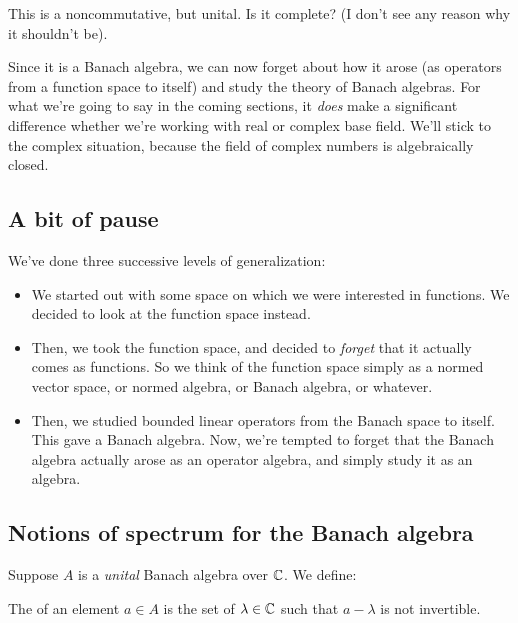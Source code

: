 \documentclass[a4paper]{amsart}
\begin{document}
This is a noncommutative, but unital. Is it complete? (I don't see any
reason why it shouldn't be).

Since it is a Banach algebra, we can now forget about how it arose (as
operators from a function space to itself) and study the theory of
Banach algebras. For what we're going to say in the coming sections,
it {\em does} make a significant difference whether we're working with
real or complex base field. We'll stick to the complex situation,
because the field of complex numbers is algebraically closed.

\subsection{A bit of pause}

We've done three successive levels of generalization:

\begin{itemize}

\item We started out with some space on which we were interested in
  functions. We decided to look at the function space instead.

\item Then, we took the function space, and decided to {\em forget}
  that it actually comes as functions. So we think of the function
  space simply as a normed vector space, or normed algebra, or Banach
  algebra, or whatever.

\item Then, we studied bounded linear operators from the Banach space
  to itself. This gave a Banach algebra. Now, we're tempted to forget
  that the Banach algebra actually arose as an operator algebra, and
  simply study it as an algebra.

\end{itemize}

\subsection{Notions of spectrum for the Banach algebra}

Suppose $A$ is a {\em unital} Banach algebra over $\mathbb{C}$. We define:

\begin{definer}[Spectrum]
  The  of an element $a \in A$ is the set of
  $\lambda \in \mathbb{C}$ such that $a - \lambda$ is not invertible.
\end{definer}
\end{document}
